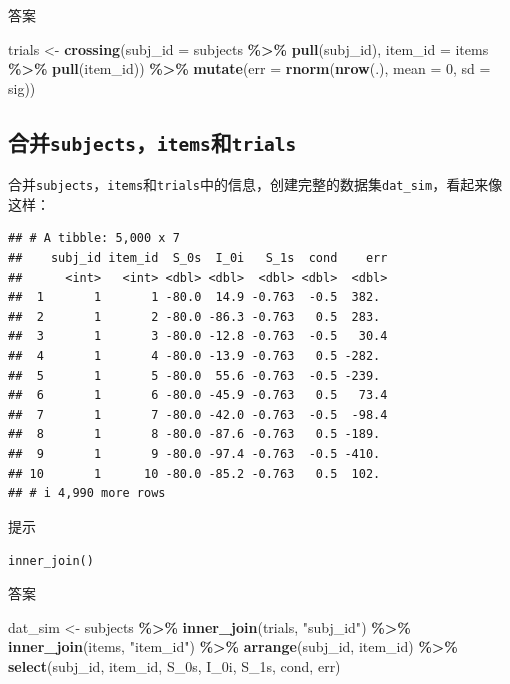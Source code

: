 \documentclass[
]{book}
\newenvironment{Shaded}{\begin{snugshade}}{\end{snugshade}}
\newcommand{\AttributeTok}[1]{\textcolor[rgb]{0.13,0.29,0.53}{#1}}
\newcommand{\DecValTok}[1]{\textcolor[rgb]{0.00,0.00,0.81}{#1}}
\newcommand{\FunctionTok}[1]{\textcolor[rgb]{0.13,0.29,0.53}{\textbf{#1}}}
\newcommand{\NormalTok}[1]{#1}
\newcommand{\OtherTok}[1]{\textcolor[rgb]{0.56,0.35,0.01}{#1}}
\newcommand{\SpecialCharTok}[1]{\textcolor[rgb]{0.81,0.36,0.00}{\textbf{#1}}}
\newcommand{\StringTok}[1]{\textcolor[rgb]{0.31,0.60,0.02}{#1}}
\begin{document}
答案

\begin{Shaded}
\begin{Highlighting}[]
\NormalTok{trials }\OtherTok{\textless{}{-}} \FunctionTok{crossing}\NormalTok{(}\AttributeTok{subj\_id =}\NormalTok{ subjects }\SpecialCharTok{\%\textgreater{}\%} \FunctionTok{pull}\NormalTok{(subj\_id),}
                   \AttributeTok{item\_id =}\NormalTok{ items }\SpecialCharTok{\%\textgreater{}\%} \FunctionTok{pull}\NormalTok{(item\_id)) }\SpecialCharTok{\%\textgreater{}\%}
  \FunctionTok{mutate}\NormalTok{(}\AttributeTok{err =} \FunctionTok{rnorm}\NormalTok{(}\FunctionTok{nrow}\NormalTok{(.), }\AttributeTok{mean =} \DecValTok{0}\NormalTok{, }\AttributeTok{sd =}\NormalTok{ sig))}
\end{Highlighting}
\end{Shaded}

\hypertarget{ux5408ux5e76subjectsitemsux548ctrials}{%
\subsection{\texorpdfstring{合并\texttt{subjects}，\texttt{items}和\texttt{trials}}{合并subjects，items和trials}}\label{ux5408ux5e76subjectsitemsux548ctrials}}

合并\texttt{subjects}，\texttt{items}和\texttt{trials}中的信息，创建完整的数据集\texttt{dat\_sim}，看起来像这样：

\begin{verbatim}
## # A tibble: 5,000 x 7
##    subj_id item_id  S_0s  I_0i   S_1s  cond    err
##      <int>   <int> <dbl> <dbl>  <dbl> <dbl>  <dbl>
##  1       1       1 -80.0  14.9 -0.763  -0.5  382. 
##  2       1       2 -80.0 -86.3 -0.763   0.5  283. 
##  3       1       3 -80.0 -12.8 -0.763  -0.5   30.4
##  4       1       4 -80.0 -13.9 -0.763   0.5 -282. 
##  5       1       5 -80.0  55.6 -0.763  -0.5 -239. 
##  6       1       6 -80.0 -45.9 -0.763   0.5   73.4
##  7       1       7 -80.0 -42.0 -0.763  -0.5  -98.4
##  8       1       8 -80.0 -87.6 -0.763   0.5 -189. 
##  9       1       9 -80.0 -97.4 -0.763  -0.5 -410. 
## 10       1      10 -80.0 -85.2 -0.763   0.5  102. 
## # i 4,990 more rows
\end{verbatim}

提示

\texttt{inner\_join()}

答案

\begin{Shaded}
\begin{Highlighting}[]
\NormalTok{dat\_sim }\OtherTok{\textless{}{-}}\NormalTok{ subjects }\SpecialCharTok{\%\textgreater{}\%}
  \FunctionTok{inner\_join}\NormalTok{(trials, }\StringTok{"subj\_id"}\NormalTok{) }\SpecialCharTok{\%\textgreater{}\%}
  \FunctionTok{inner\_join}\NormalTok{(items, }\StringTok{"item\_id"}\NormalTok{) }\SpecialCharTok{\%\textgreater{}\%}
  \FunctionTok{arrange}\NormalTok{(subj\_id, item\_id) }\SpecialCharTok{\%\textgreater{}\%}
  \FunctionTok{select}\NormalTok{(subj\_id, item\_id, S\_0s, I\_0i, S\_1s, cond, err)}
\end{Highlighting}
\end{Shaded}
\end{document}
